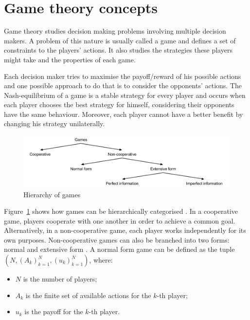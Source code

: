 \section{Game theory concepts}

Game theory studies decision making problems involving multiple decision makers.
A problem of this nature is usually called a game and defines a set of constraints to the players' actions.
It also studies the strategies these players might take and the properties of each game.

Each decision maker tries to maximise the payoff/reward of his possible actions and one possible approach to do that is to consider the opponents' actions.
The Nash-equilibrium \cite{Nash1950} of a game is a stable strategy for every player and occurs when each player chooses the best strategy for himself, considering their opponents have the same behaviour.
Moreover, each player cannot have a better benefit by changing his strategy unilaterally.

\begin{figure}[h]
\centering
\includegraphics[width=1\textwidth]{./img/gamesHierarchy}
\caption{Hierarchy of games}
\label{fig:games}
\end{figure}

Figure~\ref{fig:games} shows how games can be hierarchically categorised \cite{Osborne2011}.
In a cooperative game, players cooperate with one another in order to achieve a common goal.
Alternatively, in a non-cooperative game, each player works independently for its own purposes.
Non-cooperative games can also be branched into two forms: normal and extensive form \cite{Shoham2010}.
A normal form game can be defined as the tuple $(N,(A_k)_{k=1}^{N},(u_k)_{k=1}^{N})$, where:

\begin{itemize}
\item $N$ is the number of players;
\item $A_k$ is the finite set of available actions for the $k$-th player;
\item $u_k$ is the payoff for the $k$-th player.
\end{itemize}

